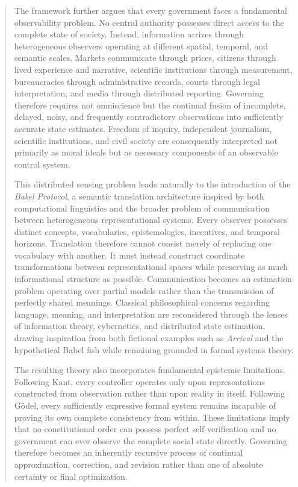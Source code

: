 \documentclass[12pt,a4paper]{article}
\begin{document}
\begin{abstract}
The framework further argues that every government faces a fundamental observability problem. No central authority possesses direct access to the complete state of society. Instead, information arrives through heterogeneous observers operating at different spatial, temporal, and semantic scales. Markets communicate through prices, citizens through lived experience and narrative, scientific institutions through measurement, bureaucracies through administrative records, courts through legal interpretation, and media through distributed reporting. Governing therefore requires not omniscience but the continual fusion of incomplete, delayed, noisy, and frequently contradictory observations into sufficiently accurate state estimates. Freedom of inquiry, independent journalism, scientific institutions, and civil society are consequently interpreted not primarily as moral ideals but as necessary components of an observable control system.

This distributed sensing problem leads naturally to the introduction of the \emph{Babel Protocol}, a semantic translation architecture inspired by both computational linguistics and the broader problem of communication between heterogeneous representational systems. Every observer possesses distinct concepts, vocabularies, epistemologies, incentives, and temporal horizons. Translation therefore cannot consist merely of replacing one vocabulary with another. It must instead construct coordinate transformations between representational spaces while preserving as much informational structure as possible. Communication becomes an estimation problem operating over partial models rather than the transmission of perfectly shared meanings. Classical philosophical concerns regarding language, meaning, and interpretation are reconsidered through the lenses of information theory, cybernetics, and distributed state estimation, drawing inspiration from both fictional examples such as \emph{Arrival} and the hypothetical Babel fish while remaining grounded in formal systems theory.

The resulting theory also incorporates fundamental epistemic limitations. Following Kant, every controller operates only upon representations constructed from observation rather than upon reality in itself. Following Gödel, every sufficiently expressive formal system remains incapable of proving its own complete consistency from within. These limitations imply that no constitutional order can possess perfect self-verification and no government can ever observe the complete social state directly. Governing therefore becomes an inherently recursive process of continual approximation, correction, and revision rather than one of absolute certainty or final optimization.


\end{abstract}
\end{document}
